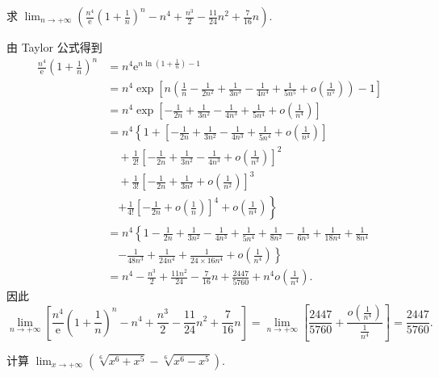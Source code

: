 \begin{example}\label{ex:4.2.3}
求 $\lim_{n\to+\infty}\left(\frac{n^{4}}{\mathrm{e}}\left(1+\frac{1}{n}\right)^{n}-n^{4}+\frac{n^{3}}{2}-\frac{11}{24}n^{2}+\frac{7}{16}n\right)$.
\end{example}

\begin{solution}
由 Taylor 公式得到
\begin{align*}
\frac{n^{4}}{\mathrm{e}}\left(1+\frac{1}{n}\right)^{n}
&= n^{4}\mathrm{e}^{n\ln\left(1+\frac{1}{n}\right)-1} \\
&= n^{4}\exp\left[n\left(\frac{1}{n}-\frac{1}{2n^{2}}+\frac{1}{3n^{3}}-\frac{1}{4n^{4}}+\frac{1}{5n^{5}}+o\left(\frac{1}{n^{5}}\right)\right)-1\right] \\
&= n^{4}\exp\left[-\frac{1}{2n}+\frac{1}{3n^{2}}-\frac{1}{4n^{3}}+\frac{1}{5n^{4}}+o\left(\frac{1}{n^{4}}\right)\right] \\
&= n^{4}\left\{1+\left[-\frac{1}{2n}+\frac{1}{3n^{2}}-\frac{1}{4n^{3}}+\frac{1}{5n^{4}}+o\left(\frac{1}{n^{4}}\right)\right]\right. \\
&\quad +\frac{1}{2!}\left[-\frac{1}{2n}+\frac{1}{3n^{2}}-\frac{1}{4n^{3}}+o\left(\frac{1}{n^{3}}\right)\right]^{2} \\
&\quad +\frac{1}{3!}\left[-\frac{1}{2n}+\frac{1}{3n^{2}}+o\left(\frac{1}{n^{2}}\right)\right]^{3} \\
&\quad \left.+\frac{1}{4!}\left[-\frac{1}{2n}+o\left(\frac{1}{n}\right)\right]^{4}+o\left(\frac{1}{n^{4}}\right)\right\} \\
&= n^{4}\left\{1-\frac{1}{2n}+\frac{1}{3n^{2}}-\frac{1}{4n^{3}}+\frac{1}{5n^{4}}+\frac{1}{8n^{2}}-\frac{1}{6n^{3}}+\frac{1}{18n^{4}}+\frac{1}{8n^{4}}\right. \\
&\quad \left.-\frac{1}{48n^{3}}+\frac{1}{24n^{4}}+\frac{1}{24\times 16n^{4}}+o\left(\frac{1}{n^{4}}\right)\right\} \\
&= n^{4}-\frac{n^{3}}{2}+\frac{11n^{2}}{24}-\frac{7}{16}n+\frac{2447}{5760}+n^{4}o\left(\frac{1}{n^{4}}\right).
\end{align*}
因此
\[
\lim_{n\to+\infty}\left[\frac{n^{4}}{\mathrm{e}}\left(1+\frac{1}{n}\right)^{n}-n^{4}+\frac{n^{3}}{2}-\frac{11}{24}n^{2}+\frac{7}{16}n\right]
=\lim_{n\to+\infty}\left[\frac{2447}{5760}+\frac{o\left(\frac{1}{n^{4}}\right)}{\frac{1}{n^{4}}}\right]=\frac{2447}{5760}.
\]
\end{solution}

\begin{example}\label{ex:4.2.4}
计算 $\lim_{x\to+\infty}\left(\sqrt[6]{x^6+x^5}-\sqrt[6]{x^6-x^5}\right)$.
\end{example}


